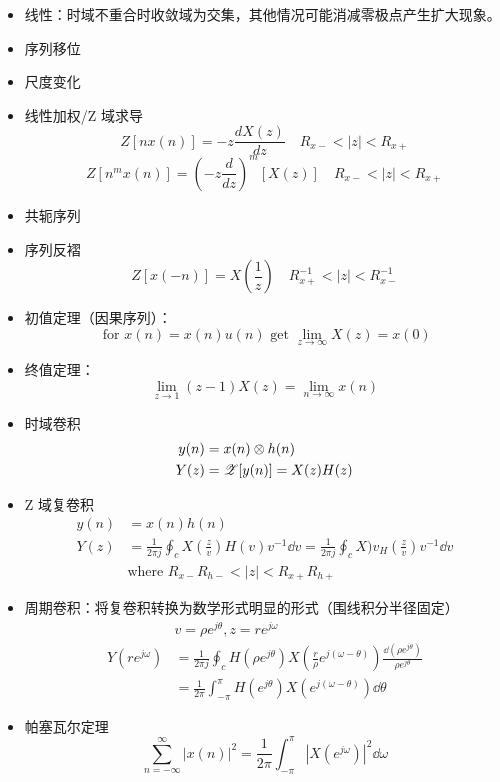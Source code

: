 \documentclass[cn,11pt,chinese,black,simple]{../elegantbook}
\begin{document}
\begin{itemize}
    \item 线性：时域不重合时收敛域为交集，其他情况可能消减零极点产生扩大现象。
    \item 序列移位
    \item 尺度变化
    \item 线性加权/Z 域求导
    \begin{equation}Z[n x(n)]=-z \frac{d X(z)}{d z} \quad R_{x-}<|z|<R_{x+}\end{equation}
    \begin{equation}Z\left[n^{m} x(n)\right]=\left(-z \frac{d}{d z}\right)^{m}[X(z)] \quad R_{x-}<|z|<R_{x+}\end{equation}
    \item 共轭序列
    \item 序列反褶
    \begin{equation}Z[x(-n)]=X\left(\frac{1}{z}\right) \quad R_{x+}^{-1}<|z|<R_{x-}^{-1}\end{equation}
    \item 初值定理（因果序列）：
    \[\text{ for } x(n) = x(n) u(n) \text{ get } \lim_{z \rightarrow \infty} X(z) = x(0)\]
    \item 终值定理：
    \[\lim_{z \rightarrow 1} (z-1) X(z) = \lim_{n \rightarrow \infty} x(n)\]
    \item 时域卷积
    \[\begin{aligned}
        y(n) &= x(n) \otimes h(n) \\ 
        Y(z) &= \mathscr{Z}[y(n)] = X(z) H(z) 
    \end{aligned}\]
    \item Z 域复卷积
    \[
    \begin{aligned}
        y(n) &= x(n) h(n) \\ 
        Y(z) &= \frac{1}{2 \pi j} \oint_c X(\frac{z}{v}) H(v) v^{-1} \dd{v} = \frac{1}{2 \pi j} \oint_c X)v_ H(\frac{z}{v}) v^{-1} \dd{v}\\
        &\text{where } R_{x-} R_{h-} < |z| < R_{x+} R_{h+}
    \end{aligned}    
    \]
    \item 周期卷积：将复卷积转换为数学形式明显的形式（围线积分半径固定）
    \[
    \begin{aligned}
        & v = \rho e^{j \theta} , z = r e^{j \omega}  \\ 
    Y(r e^{j \omega}) &= \frac{1}{2 \pi j} \oint_c H(\rho e^{j \theta}) X(\frac{r}{\rho} e^{j (\omega - \theta)}) \frac{\dd{(\rho e^{j\theta})}}{\rho e^{j\theta}} \\ 
    &= \frac{1}{2\pi} \int_{-\pi}^{\pi} H(e^{j \theta}) X(e^{j(\omega-\theta)}) \dd{\theta}
    \end{aligned}
    \]
    \item  帕塞瓦尔定理
    \[\sum_{n = -\infty} ^{\infty} |x(n)|^2 = \frac{1}{2 \pi}\int_{-\pi} ^\pi |X(e^{j\omega} )|^2 \dd{\omega}\]
\end{itemize}
\end{document}
